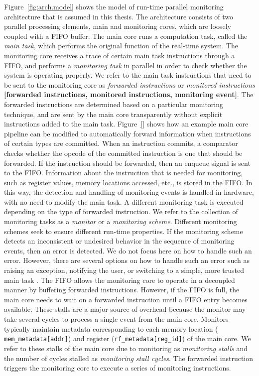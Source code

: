 Figure~\ref{fig:arch.model} shows the model of run-time parallel monitoring
architecture that is assumed in this thesis. The architecture consists of two
parallel processing elements, main and monitoring cores, which are loosely coupled
with a FIFO buffer.
The main core runs a computation task, called the {\em main task}, which performs 
the original function of the real-time system. The monitoring core receives a 
trace of certain main task instructions through a FIFO, and performs a {\em monitoring task} 
in parallel in order to check whether the system is operating properly. We refer to the main task instructions that need to be sent to the monitoring
core as {\em forwarded instructions} or {\em monitored instructions} \textbf{[forwarded instructions, monitored instructions, monitoring event]}. The forwarded instructions are determined based
on a particular monitoring technique, and are sent by the main core transparently without
explicit instructions added to the main task. Figure~\ref{} shows how an
example main core pipeline can be modified to automatically forward information
when instructions of certain types are committed. When an instruction commits,
a comparator checks whether the opcode of the committed instruction is one that
should be forwarded. If the instruction should be forwarded, then an enqueue
signal is sent to the FIFO. Information about the instruction that is needed
for monitoring, such as register values, memory locations accessed, etc., is
stored in the FIFO. In this way, the detection and handling of monitoring
events is handled in hardware, with no need to modify the main task.
A different monitoring task is executed depending on the type of forwarded
instruction. We refer to the collection of monitoring tasks as a \emph{monitor}
or a \emph{monitoring scheme}. Different monitoring schemes seek to ensure
different run-time properties. If the monitoring scheme detects an inconsistent
or undesired behavior in the sequence of monitoring events, then an error is
detected. We do not focus here on how to handle such an error. However, there
are several options on how to handle such an error such as raising an
exception, notifying the user, or switching to a simple, more trusted main
task \cite{sha-simplex-sw01}.
The FIFO allows the monitoring core to operate in a
decoupled manner by buffering forwarded instructions. However, if the FIFO is full,
the main core needs to wait on a forwarded instruction until a FIFO entry becomes available.
These stalls are a major source of overhead because the monitor may take
several cycles to process a single event from the main core. Monitors typically
maintain metadata corresponding to each memory location ({\tt
mem\_metadata[addr]}) and register ({\tt rf\_metadata[reg\_id]}) of the main
core.
We refer to these stalls of the main core due to monitoring as
{\em monitoring stalls} and the number of cycles stalled as {\em monitoring stall cycles}.
The forwarded instruction triggers the monitoring core to execute a series of
monitoring instructions. 

